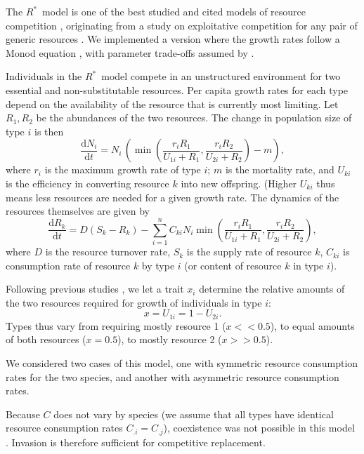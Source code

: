 \documentclass[a4paper,11pt]{article}
\newcommand{\ud}{\ensuremath{\mathrm{d}}}
\newcommand{\Rstar}{\ensuremath{R^*}}
\begin{document}
The \Rstar\ model is one of the best studied and cited models of resource competition \citep{Tilman-1977, Tilman-1982, Huisman-2001}, originating from a study on exploitative competition for any pair of generic resources \citep{Leon-1975}. We implemented a version where the growth rates follow a Monod equation \citep{Huisman-2001}, with parameter trade-offs assumed by \citet{Fox-2008}.

Individuals in the \Rstar\ model compete in an unstructured environment for two essential and non-substitutable resources. Per capita growth rates for each type depend on the availability of the resource that is currently most limiting. Let $R_1, R_2$ be the abundances of the two resources. The change in population size of type $i$ is then
\begin{equation}
  \label{eq:rstar-n}
  \frac{\ud N_i}{\ud t} = N_i \, \left(\min\left(\frac{r_i R_1}{U_{1i} + R_1}, \frac{r_i R_2}{U_{2i} + R_2}\right) - m\right),
\end{equation}
where $r_i$ is the maximum growth rate of type $i$; $m$ is the mortality rate, and $U_{ki}$ is the efficiency in converting resource $k$ into new offspring. (Higher $U_{ki}$ thus means less  resources are needed for a given growth rate. The dynamics of the resources themselves are given by
\begin{equation}
  \label{eq:rstar-r}
  \frac{\ud R_k}{\ud t} =
  D (S_k - R_k) - \sum_{i=1}^n {C_{ki} N_i
    \min\left(\frac{r_i R_1}{U_{1i} + R_1}, \frac{r_i R_2}{U_{2i} + R_2}\right)},
\end{equation}
where $D$ is the resource turnover rate, $S_k$ is the supply rate of resource $k$, $C_{ki}$ is consumption rate of resource $k$ by type $i$ (or content of resource $k$ in type $i$).

Following previous studies \citep{Tilman-1985, Schreiber-2003, Fox-2008}, we let a trait $x_i$ determine the relative amounts of the two resources required for growth of individuals in type $i$: \begin{equation}
\label{eq:R3}
x = U_{1i} = 1 - U_{2i}.
\end{equation}
Types thus vary from requiring mostly resource 1 ($x << 0.5$), to equal amounts of both resources ($x = 0.5$), to mostly resource 2 ($x >> 0.5$).

We considered two cases of this model, one with symmetric resource consumption rates for the two species, and another with asymmetric resource consumption rates.

Because $C$ does not vary by species (we assume that all types have identical resource consumption rates $C_{.i} = C_{.j}$), coexistence was not possible in this model \citep{Tilman-1982}. Invasion is therefore sufficient for competitive replacement.
\end{document}
